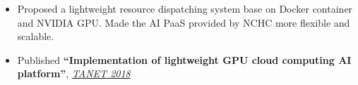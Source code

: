 \documentclass[letterpaper,11pt]{article}
\makeatletter
\newcommand{\resumeItemTwo}[1]{
  \item\small{
    {#1 \vspace{-2pt}}
  }
}
\newcommand{\resumeSubheading}[4]{
  \vspace{1pt}%
    \begin{tabular*}{0.97\textwidth}{l@{\extracolsep{\fill}}r}
      \textbf{#1} & #2 \\
      \textit{\small#3} & \textit{\small #4} \\
    \end{tabular*}\vspace{-5pt}
}
\newcommand{\resumeSubHeadingListStart}{}%
\newcommand{\resumeSubHeadingListEnd}{}%
\newcommand{\resumeItemListStart}{\begin{itemize}}
\newcommand{\resumeItemListEnd}{\end{itemize}\vspace{-5pt}}
\makeatother
\begin{document}
      \resumeItemListStart
        \resumeItemTwo{Proposed a lightweight resource dispatching system base on Docker container and NVIDIA GPU. Made the AI PaaS provided by NCHC more flexible and scalable.}
        \resumeItemTwo{Published \textbf{“Implementation of lightweight GPU cloud computing AI platform”}, \textit{\href{https://cis.ncu.edu.tw/SeminarSys/activity/TANET2018/news/19}{TANET 2018}}}
      \resumeItemListEnd
  \resumeSubHeadingListEnd
\end{document}
